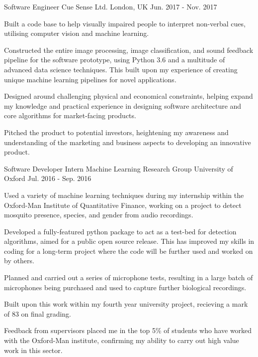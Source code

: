 \begin{cventries}
    \cventry
        {Software Engineer}
        {Cue Sense Ltd.}
        {London, UK}
        {Jun. 2017 - Nov. 2017}
        {
            \begin{cvitems}
                \item{Built a code base to help visually impaired people to interpret non-verbal cues, utilising computer vision and machine learning.}
                \item{Constructed the entire image processing, image classification, and sound feedback pipeline for the software prototype, using Python 3.6 and a multitude of advanced data science techniques. This built upon my experience of creating unique machine learning pipelines for novel applications.}
                \item{Designed around challenging physical and economical constraints, helping expand my knowledge and practical experience in designing software architecture and core algorithms for market-facing products.}
                \item{Pitched the product to potential investors, heightening my awareness and understanding of the marketing and business aspects to developing an innovative product.}
            \end{cvitems}
        }
        \vspace{-0.2cm}


    \cventry
        {Software Developer Intern}
        {Machine Learning Research Group}
        {University of Oxford}
        {Jul. 2016 - Sep. 2016}
        {
            \begin{cvitems}
                \item{Used a variety of machine learning techniques during my internship within the Oxford-Man Institute of Quantitative Finance, working on a project to detect mosquito presence, species, and gender from audio recordings.}
                \item{Developed a fully-featured python package to act as a test-bed for detection algorithms, aimed for a public open source release. This has improved my skills in coding for a long-term project where the code will be further used and worked on by others.}
                \item{Planned and carried out a series of microphone tests, resulting in a large batch of microphones being purchased and used to capture further biological recordings.}
                \item{Built upon this work within my fourth year university project, recieving a mark of 83 on final grading.}
                \item{Feedback from supervisors placed me in the top 5\% of students who have worked with the Oxford-Man institute, confirming my ability to carry out high value work in this sector.}
            \end{cvitems}
        }
        \vspace{-0.2cm}



\end{cventries}
